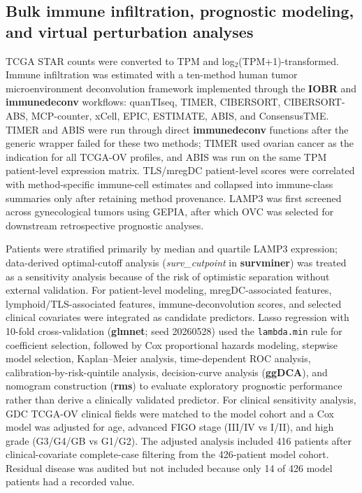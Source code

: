 \documentclass[pdflatex,sn-vancouver-num]{sn-jnl}
\begin{document}
\subsection{Bulk immune infiltration, prognostic modeling, and virtual perturbation analyses}
TCGA STAR counts were converted to TPM and log$_2$(TPM+1)-transformed. Immune infiltration was estimated with a ten-method human tumor microenvironment deconvolution framework implemented through the \textbf{IOBR} and \textbf{immunedeconv} workflows: quanTIseq, TIMER, CIBERSORT, CIBERSORT-ABS, MCP-counter, xCell, EPIC, ESTIMATE, ABIS, and ConsensusTME\cite{bib56,bib57}. TIMER and ABIS were run through direct \textbf{immunedeconv} functions after the generic wrapper failed for these two methods; TIMER used ovarian cancer as the indication for all TCGA-OV profiles, and ABIS was run on the same TPM patient-level expression matrix. TLS/mregDC patient-level scores were correlated with method-specific immune-cell estimates and collapsed into immune-class summaries only after retaining method provenance. LAMP3 was first screened across gynecological tumors using GEPIA, after which OVC was selected for downstream retrospective prognostic analyses\cite{bib58}.

Patients were stratified primarily by median and quartile LAMP3 expression; data-derived optimal-cutoff analysis (\textit{surv\_cutpoint} in \textbf{survminer}) was treated as a sensitivity analysis because of the risk of optimistic separation without external validation. For patient-level modeling, mregDC-associated features, lymphoid/TLS-associated features, immune-deconvolution scores, and selected clinical covariates were integrated as candidate predictors. Lasso regression with 10-fold cross-validation (\textbf{glmnet}; seed 20260528) used the \texttt{lambda.min} rule for coefficient selection, followed by Cox proportional hazards modeling, stepwise model selection, Kaplan--Meier analysis, time-dependent ROC analysis, calibration-by-risk-quintile analysis, decision-curve analysis (\textbf{ggDCA}), and nomogram construction (\textbf{rms}) to evaluate exploratory prognostic performance rather than derive a clinically validated predictor\cite{bib59,bib61,bib62,bib63,bib64,bib112}. For clinical sensitivity analysis, GDC TCGA-OV clinical fields were matched to the model cohort and a Cox model was adjusted for age, advanced FIGO stage (III/IV vs I/II), and high grade (G3/G4/GB vs G1/G2). The adjusted analysis included 416 patients after clinical-covariate complete-case filtering from the 426-patient model cohort. Residual disease was audited but not included because only 14 of 426 model patients had a recorded value.
\end{document}
